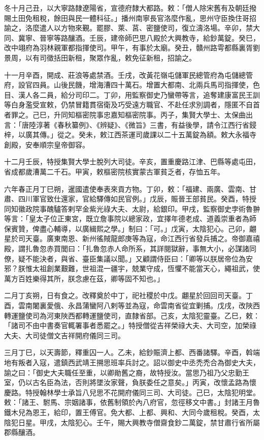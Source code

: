 \begin{pinyinscope}
 冬十月己丑，以大寧路隸遼陽省，宣德府隸大都路。敕：「僧人除宋舊有及朝廷撥賜土田免租稅，餘田與民一體科征。」播州南寧長官洛麼作亂，思州守臣換住哥招諭之，洛麼遣人以方物來覲。罷膠、萊、莒、密鹽使司，復立濤洛場。辛卯，禁大同、冀寧、晉寧等路釀酒。壬辰，建帝師巴思八殿於大興教寺，給鈔萬錠。癸巳，改中翊府為羽林親軍都指揮使司。甲午，有事於太廟。癸丑，贛州路雩都縣裏胥劉景周，以有司徵括田新租，聚眾作亂，敕免征新租，招諭之。



 十一月辛酉，開成、莊浪等處禁酒。壬戌，改黃花嶺屯儲軍民總管府為屯儲總管府，設官四員。山後民饑，增海漕四十萬石。增置大都南、北兩兵馬司指揮使，色目、漢人各二員，給分司印二。丁卯，用監察御史乃蠻帶等言，追奪建康富民王訓等白身濫受宣敕，仍禁冒籍貫宿衛及巧受遠方職官、不赴任求別調者，隱匿不自首者罪之。己巳，升同知樞密院事忠嘉知樞密院事。丙子，集賢大學士、太保曲出言：「唐陸淳著《春秋纂例》、《辨疑》、《微旨》三書，有益後學，請令江西行省鋟梓，以廣其傳。」從之。癸未，敕江西茶運司歲課以二十五萬錠為額。敕大永福寺創殿，安奉順宗皇帝御容。



 十二月壬辰，特授集賢大學士脫列大司徒。辛亥，置重慶路江津、巴縣等處屯田，省成都歲漕萬二千石。甲寅，敕樞密院核實蒙古軍貧乏者，存恤五年。



 六年春正月丁巳朔，暹國遣使奉表來貢方物。丁卯，敕：「福建、兩廣、雲南、甘肅、四川軍官致仕還家，官給驛傳如民官例。」戊辰，賑晉王部貧民。癸酉，特授同知徽政院事醜驢答剌罕金紫光祿大夫、太尉，給銀印。甲戌，監察御史孛術魯翀等言：「皇太子位正東宮，既立詹事院以總家政，宜擇年德老成、道義崇重者為師保賓贊，俾盡心輔導，以廣緝熙之學。」制曰：「可。」戊寅，太陰犯心。己卯，翽星於司天臺。廣東南恩、新州徭賊龍郎庚等為寇，命江西行省發兵捕之。帝御嘉禧殿，謂扎魯忽赤買閭曰：「扎魯忽赤人命所系，其詳閱獄辭，事無大小，必謀諸同僚，疑不能決者，與省、臺臣集議以聞。」又顧謂侍臣曰：「卿等以朕居帝位為安邪？朕惟太祖創業艱難，世祖混一疆宇，兢業守成，恆懼不能當天心，繩祖武，使萬方百姓樂得其所，朕念慮在茲，卿等固不知也。」



 二月丁亥朔，日有食之。改釋奠於中丁，祀社稷於中戊。翽星於回回司天臺。丁酉，雲南闍裏愛俄、永昌蒲蠻阿八剌等並為寇，命雲南省從宜剿捕。戊戌，改陜西轉運鹽使司為河東陜西都轉運鹽使司，直隸省部。己亥，太陰犯靈臺。乙巳，敕：「諸司不由中書奏官輒署事者悉罷之。」特授僧從吉祥榮祿大夫、大司空，加榮祿大夫、大司徒僧文吉祥開府儀同三司。



 三月丁巳，以天壽節，釋重囚一人。乙未，給鈔賑濟上都、西番諸驛。辛酉，斡端地有叛者入寇，遣鎮西武靖王搠思班率兵討之。詔以御史中丞禿禿合為御史大夫，諭之曰：「御史大夫職任至重，以卿勛舊之裔，故特授汝。當思乃祖乃父忠勤王室，仍以古名臣為法，否則將墜汝家聲，負朕委任之意矣。」丙寅，改懷孟路為懷慶路。特授翰林學士承旨八兒思不花開府儀同三司、大司徒。己巳，太陰犯明堂。敕：「諸王、駙馬、宗姻諸事，依舊制領於內八府官，忽徑移文中書。」封諸王月魯鐵木兒為恩王，給印，置王傅官。免大都、上都、興和、大同今歲租稅。癸酉，太陰犯日星。甲戌，太陰犯心。壬午，賜大興教寺僧齋食鈔二萬錠，禁甘肅行省所屬郡縣釀酒。




\end{pinyinscope}
